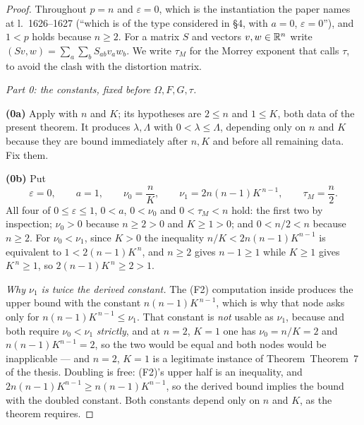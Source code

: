 \begin{proof}
Throughout $p=n$ and $\varepsilon=0$, which is the instantiation the paper names
at l.~1626--1627 (``which is of the type considered in \S4, with $a=0$,
$\varepsilon=0$''), and $1<p$ holds because $n\ge2$.  For a matrix $S$ and
vectors $v,w\in\mathbb{R}^n$ write $(Sv,w)=\sum_a\sum_bS_{ab}v_aw_b$.  We write $\tau_M$
for the Morrey exponent that  calls $\tau$, to
avoid the clash with the distortion matrix.

\medskip
\noindent\emph{Part 0: the constants, fixed before $\Omega,F,G,\tau$.}

\textbf{(0a)} Apply  with $n$ and $K$; its
hypotheses are $2\le n$ and $1\le K$, both data of the present theorem.  It
produces $\lambda,\Lambda$ with $0<\lambda\le\Lambda$, depending only on $n$ and
$K$ because they are bound immediately after $n,K$ and before all remaining
data.  Fix them.

\textbf{(0b)} Put
\[
\varepsilon=0,\qquad a=1,\qquad
\nu_0=\frac nK,\qquad \nu_1=2n(n-1)K^{\,n-1},\qquad \tau_M=\frac n2 .
\]
All four of $0\le\varepsilon\le1$, $0<a$, $0<\nu_0$ and $0<\tau_M<n$ hold: the
first two by inspection; $\nu_0>0$ because $n\ge2>0$ and $K\ge1>0$; and
$0<n/2<n$ because $n\ge2$.  For $\nu_0<\nu_1$, since $K>0$ the inequality
$n/K<2n(n-1)K^{n-1}$ is equivalent to $1<2(n-1)K^{\,n}$, and $n\ge2$ gives
$n-1\ge1$ while $K\ge1$ gives $K^{\,n}\ge1$, so $2(n-1)K^{\,n}\ge2>1$.

\emph{Why $\nu_1$ is twice the derived constant.}  The (F2) computation inside
 produces the upper bound with the
constant $n(n-1)K^{\,n-1}$, which is why that node asks only for
$n(n-1)K^{\,n-1}\le\nu_1$.  That
constant is \emph{not} usable as $\nu_1$, because
 and  both
require $\nu_0<\nu_1$ \emph{strictly}, and at $n=2$, $K=1$ one has
$\nu_0=n/K=2$ and $n(n-1)K^{n-1}=2$, so the two would be equal and both nodes
would be inapplicable --- and $n=2$, $K=1$ is a legitimate instance of
Theorem~Theorem~7 of the thesis.  Doubling is free: (F2)'s upper half is an inequality, and
$2n(n-1)K^{n-1}\ge n(n-1)K^{n-1}$, so the derived bound implies the bound with
the doubled constant.  Both constants depend only on $n$ and $K$, as the theorem
requires.


\end{proof}
